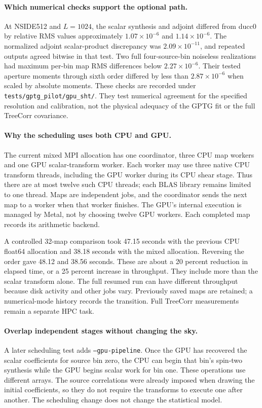 \documentclass[11pt]{article}
\begin{document}
\paragraph{Which numerical checks support the optional path.}
At NSIDE512 and $L=1024$, the scalar synthesis and adjoint differed from
ducc0 by relative RMS values approximately $1.07\times10^{-6}$ and
$1.14\times10^{-6}$. The normalized adjoint scalar-product discrepancy was
$2.09\times10^{-11}$, and repeated outputs agreed bitwise in that test.
Two full four-source-bin noiseless realizations had maximum per-bin map
RMS differences below $2.27\times10^{-6}$. Their tested aperture moments
through sixth order differed by less than $2.87\times10^{-6}$ when scaled
by absolute moments. These checks are recorded under
\texttt{tests/gptg\_pilot/gpu\_sht/}. They test numerical agreement for the
specified resolution and calibration, not the physical adequacy of the
GPTG fit or the full TreeCorr covariance.

\paragraph{Why the scheduling uses both CPU and GPU.}
The current mixed MPI allocation has one coordinator, three CPU map
workers and one GPU scalar-transform worker. Each worker may use three
native CPU transform threads, including the GPU worker during its CPU
shear stage. Thus there are at most twelve such CPU threads; each BLAS
library remains limited to one thread. Maps are independent jobs, and
the coordinator sends the next map to a worker when that worker finishes.
The GPU's internal execution is managed by Metal, not by choosing twelve
GPU workers. Each completed map records its arithmetic backend.

A controlled 32-map comparison took 47.15 seconds with the previous CPU
float64 allocation and 38.18 seconds with the mixed allocation. Reversing
the order gave 48.12 and 38.56 seconds. These are about a 20 percent
reduction in elapsed time, or a 25 percent increase in throughput. They
include more than the scalar transform alone. The full resumed run can
have different throughput because disk activity and other jobs vary.
Previously saved maps are retained; a numerical-mode history records the
transition. Full TreeCorr measurements remain a separate HPC task.


\paragraph{Overlap independent stages without changing the sky.}
A later scheduling test adds \texttt{--gpu-pipeline}. Once the GPU has
recovered the scalar coefficients for source bin zero, the CPU can begin
that bin's spin-two synthesis while the GPU begins scalar work for bin
one. These operations use different arrays. The source correlations were
already imposed when drawing the initial coefficients, so they do not
require the transforms to execute one after another. The scheduling change
does not change the statistical model.
\end{document}
